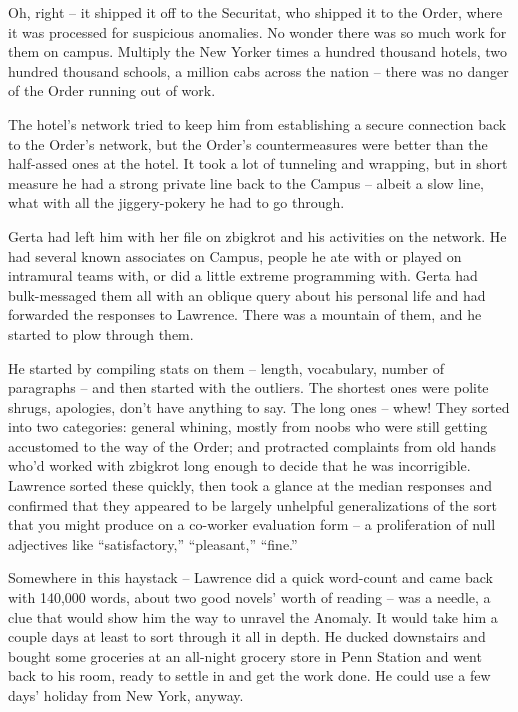 Oh, right -- it shipped it off to the Securitat, who shipped it to the 
Order, where it was processed for suspicious anomalies. No wonder there 
was so much work for them on campus. Multiply the New Yorker times a 
hundred thousand hotels, two hundred thousand schools, a million cabs 
across the nation -- there was no danger of the Order running out of 
work.

The hotel's network tried to keep him from establishing a secure 
connection back to the Order's network, but the Order's countermeasures 
were better than the half-assed ones at the hotel. It took a lot of 
tunneling and wrapping, but in short measure he had a strong private 
line back to the Campus -- albeit a slow line, what with all the 
jiggery-pokery he had to go through.

Gerta had left him with her file on zbigkrot and his activities on the 
network. He had several known associates on Campus, people he ate with 
or played on intramural teams with, or did a little extreme programming 
with. Gerta had bulk-messaged them all with an oblique query about his 
personal life and had forwarded the responses to Lawrence. There was a 
mountain of them, and he started to plow through them.

He started by compiling stats on them -- length, vocabulary, number of 
paragraphs -- and then started with the outliers. The shortest ones 
were polite shrugs, apologies, don't have anything to say. The long 
ones -- whew! They sorted into two categories: general whining, mostly 
from noobs who were still getting accustomed to the way of the Order; 
and protracted complaints from old hands who'd worked with zbigkrot 
long enough to decide that he was incorrigible. Lawrence sorted these 
quickly, then took a glance at the median responses and confirmed that 
they appeared to be largely unhelpful generalizations of the sort that 
you might produce on a co-worker evaluation form -- a proliferation of 
null adjectives like “satisfactory,” “pleasant,” “fine.”

Somewhere in this haystack -- Lawrence did a quick word-count and came 
back with 140,000 words, about two good novels' worth of reading -- was 
a needle, a clue that would show him the way to unravel the Anomaly. It 
would take him a couple days at least to sort through it all in depth. 
He ducked downstairs and bought some groceries at an all-night grocery 
store in Penn Station and went back to his room, ready to settle in and 
get the work done. He could use a few days' holiday from New York, 
anyway.

